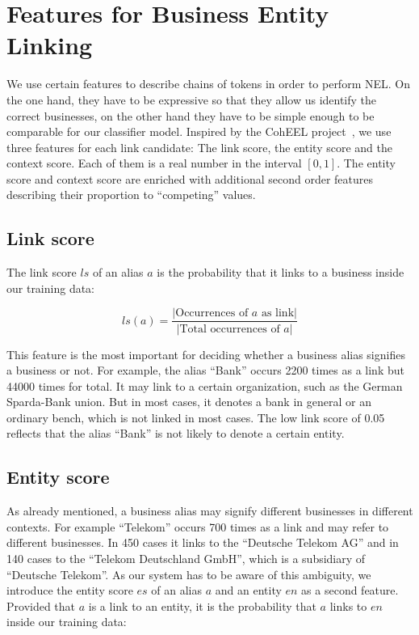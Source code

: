 \section{Features for Business Entity Linking}
\label{sec:features}
We use certain features to describe chains of tokens in order to perform NEL. On the one hand, they have to be expressive so that they allow us identify the correct businesses, on the other hand they have to be simple enough to be comparable for our classifier model. Inspired by the CohEEL project~\cite{coheel}, we use three features for each link candidate: The link score, the entity score and the context score. Each of them is a real number in the interval $[0, 1]$. The entity score and context score are enriched with additional second order features describing their proportion to "`competing"' values.



\subsection{Link score}
\label{sec:link_score}
The link score $ls$ of an alias $a$ is the probability that it links to a business inside our training data:

\begin{equation*} %
ls(a) = \frac{|\text{Occurrences of $a$ as link}|}{|\text{Total occurrences of $a$}|}
\end{equation*}

This feature is the most important for deciding whether a business alias signifies a business or not. For example, the alias "`Bank"' occurs 2200 times as a link but 44000 times for total. It may link to a certain organization, such as the German Sparda-Bank union. But in most cases, it denotes a bank in general or an ordinary bench, which is not linked in most cases. The low link score of 0.05 reflects that the alias "`Bank"' is not likely to denote a certain entity.\\



\subsection{Entity score}
\label{sec:entity_score}
As already mentioned, a business alias may signify different businesses in different contexts. For example "`Telekom"' occurs 700 times as a link and may refer to different businesses. In 450 cases it links to the "`Deutsche Telekom AG"' and in 140 cases to the "`Telekom Deutschland GmbH"', which is a subsidiary of "`Deutsche Telekom"'.\footnotemark{} As our system has to be aware of this ambiguity, we introduce the entity score $es$ of an alias $a$ and an entity $en$ as a second feature. Provided that $a$ is a link to an entity, it is the probability that $a$ links to $en$ inside our training data:

